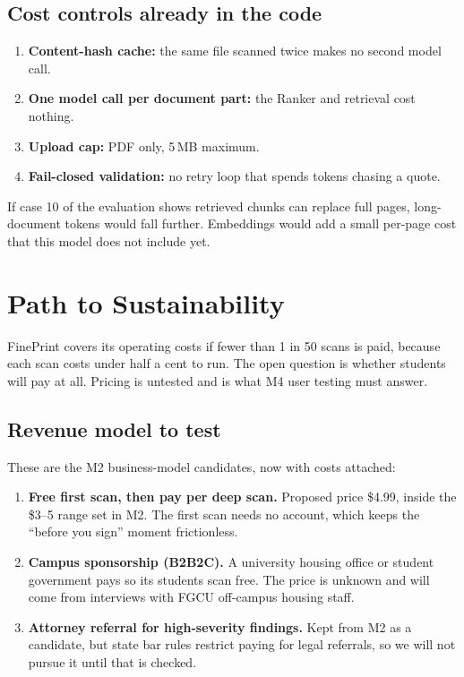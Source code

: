 \documentclass[11pt,letterpaper]{article}
\begin{document}
\subsection{Cost controls already in the code}

\begin{enumerate}
  \item \textbf{Content-hash cache:} the same file scanned twice makes no second model call.
  \item \textbf{One model call per document part:} the Ranker and retrieval cost nothing.
  \item \textbf{Upload cap:} PDF only, 5\,MB maximum.
  \item \textbf{Fail-closed validation:} no retry loop that spends tokens chasing a quote.
\end{enumerate}

If case 10 of the evaluation shows retrieved chunks can replace full pages, long-document tokens would fall further. Embeddings would add a small per-page cost that this model does not include yet.

\section{Path to Sustainability}

FinePrint covers its operating costs if fewer than 1 in 50 scans is paid, because each scan costs under half a cent to run. The open question is whether students will pay at all. Pricing is untested and is what M4 user testing must answer.

\subsection{Revenue model to test}

These are the M2 business-model candidates, now with costs attached:
\begin{enumerate}
  \item \textbf{Free first scan, then pay per deep scan.} Proposed price \$4.99, inside the \$3--5 range set in M2. The first scan needs no account, which keeps the ``before you sign'' moment frictionless.
  \item \textbf{Campus sponsorship (B2B2C).} A university housing office or student government pays so its students scan free. The price is unknown and will come from interviews with FGCU off-campus housing staff.
  \item \textbf{Attorney referral for high-severity findings.} Kept from M2 as a candidate, but state bar rules restrict paying for legal referrals, so we will not pursue it until that is checked.
\end{enumerate}
\end{document}
